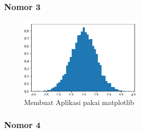 \subsubsection{Nomor 3}
\hfill\break

\begin{figure}[H]
\centerline{\includegraphics[width=6cm]{figures/1174089/3/praktek2.PNG}}
\caption{Membuat Aplikasi pakai matplotlib}
\label{labelgambar}
\end{figure}

\subsubsection{Nomor 4}
\hfill\break

